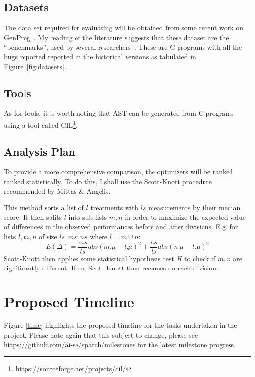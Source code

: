 \documentclass[9pt, compsoc, journal]{IEEEtran}
\begin{document}
\subsection{Datasets}
The data set required for evaluating will be obtained from some recent work on GenProg~\cite{leGoues12}. My reading of the literature suggests that these dataset are the ``benchmarks'', used by several researchers~\cite{qi2014}. These are C programs with all the bugs reported reported in the historical versions as tabulated in Figure~\ref{fig:datasets}.

\subsection{Tools}
As for tools, it is worth noting that AST can be generated from C programs using a tool called CIL\footnote{https://sourceforge.net/projects/cil/}.  

\subsection{Analysis Plan}
To provide a more comprehensive comparison, the optimizers will be ranked ranked statistically. To do this, I shall use the Scott-Knott procedure recommended by Mittas \& Angelis\cite{mittas13}. 

This method sorts a list of $l$ treatments with $ls$ measurements by their median
score. It then
splits $l$ into sub-lists $m,n$ in order to maximize the expected value of
differences  in the observed performances
before and after divisions. E.g. for lists $l,m,n$ of size $ls,ms,ns$ where $l=m\cup n$:
\[E(\Delta)=\frac{ms}{ls}abs(m.\mu - l.\mu)^2 + \frac{ns}{ls}abs(n.\mu - l.\mu)^2\]
Scott-Knott then applies some statistical hypothesis test $H$ to check
if $m,n$ are significantly different. If so, Scott-Knott then recurses on each division.



\section{Proposed Timeline}

Figure \ref{time} highlights the proposed timeline for the tasks undertaken in the project. Please note again that this subject to change, please see \href{https://github.com/ai-se/spatch/milestones}{{https://github.com/ai-se/spatch/milestones}} for the latest milestone progress.\\
\pagebreak


\end{document}
